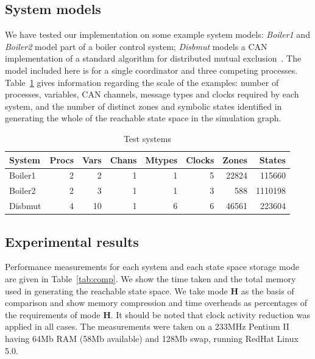 \subsection{System models}
We have tested our implementation on some example system models:
\emph{Boiler1} and \emph{Boiler2} model part of a boiler control
system; \emph{Disbmut} models a CAN implementation of a standard
algorithm for distributed mutual exclusion~\cite{tan:92}. The model
included here is for a single coordinator and three competing
processes. Table~\ref{tab:sys} gives information regarding the scale
of the examples: number of processes, variables, CAN channels, message
types and clocks required by each system, and the number of distinct
zones and symbolic states identified in generating the whole of the
reachable state space in the simulation graph.

\begin{table}
\begin{center}
\begin{tabular}{|l|r|r|r|r|r|r|r|}
\hline
\bf System & \bf Procs & \bf Vars & \bf Chans & \bf Mtypes & \bf Clocks & \bf Zones & \bf States \\
\hline
 Boiler1    & 2         & 2         & 1         &   1        &    5       & 22824     &  115660 \\
 Boiler2    & 2         & 3         & 1         &   1        &    3       & 588       &  1110198 \\ 
 Disbmut    & 4         & 10        & 1         &   6        &    6       & 46561     & 223604 \\    
\hline
\end{tabular}
\end{center}
\caption{Test systems \label{tab:sys}}
\end{table}

\subsection{Experimental results}
Performance measurements for each system and each state space storage
mode are given in Table~\ref{tab:comp}. We show the time taken and the
total memory used in generating the reachable state space. We take
mode {\bfseries H} as the basis of comparison and show memory
compression and time overheads as percentages of the requirements of
mode {\bfseries H}. It should be noted that clock activity reduction
was applied in all cases. The
measurements were taken on a 233MHz Pentium II having 64Mb RAM (58Mb
available) and 128Mb swap, running RedHat Linux 5.0.

